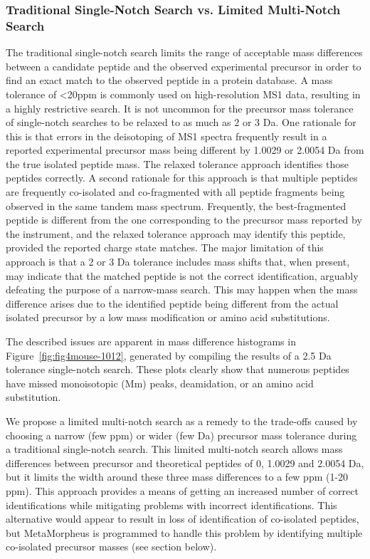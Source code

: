 \documentclass[journal=jprobs,manuscript=article]{achemso}
\begin{document}
\subsubsection{Traditional Single-Notch Search vs. Limited Multi-Notch Search}

The traditional single-notch search limits the range of acceptable mass differences between a candidate peptide and the observed experimental precursor in order to find an exact match to the observed peptide in a protein database.
A mass tolerance of <20ppm is commonly used on high-resolution MS1 data, resulting in a highly restrictive search.
It is not uncommon for the precursor mass tolerance of single-notch searches to be relaxed to as much as 2 or 3 Da.
One rationale for this is that errors in the deisotoping of MS1 spectra frequently result in a reported experimental precursor mass being different by 1.0029 or 2.0054 Da from the true isolated peptide mass.
The relaxed tolerance approach identifies those peptides correctly.
A second rationale for this approach is that multiple peptides are frequently co-isolated and co-fragmented with all peptide fragments being observed in the same tandem mass spectrum.
Frequently, the best-fragmented peptide is different from the one corresponding to the precursor mass reported by the instrument, and the relaxed tolerance approach may identify this peptide, provided the reported charge state matches.
The major limitation of this approach is that a 2 or 3 Da tolerance includes mass shifts that, when present, may indicate that the matched peptide is not the correct identification, arguably defeating the purpose of a narrow-mass search.
This may happen when the mass difference arises due to the identified peptide being different from the actual isolated precursor by a low mass modification or amino acid substitutions.

The described issues are apparent in mass difference histograms in Figure~\ref{fig:fig4mouse-1012}, generated by compiling the results of a 2.5 Da tolerance single-notch search.
These plots clearly show that numerous peptides have missed monoisotopic (Mm) peaks, deamidation, or an amino acid substitution.

We propose a limited multi-notch search as a remedy to the trade-offs caused by choosing a narrow (few ppm) or wider (few Da) precursor mass tolerance during a traditional single-notch search.
This limited multi-notch search allows mass differences between precursor and theoretical peptides of 0, 1.0029 and 2.0054 Da, but it limits the width around these three mass differences to a few ppm (1-20 ppm).
This approach provides a means of getting an increased number of correct identifications while mitigating problems with incorrect identifications.
This alternative would appear to result in loss of identification of co-isolated peptides, but MetaMorpheus is programmed to handle this problem by identifying multiple co-isolated precursor masses (see section below).
\end{document}
